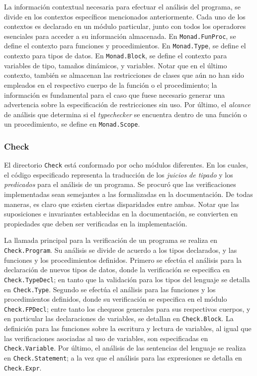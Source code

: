 La información contextual necesaria para efectuar el análisis del programa, se divide en los contextos específicos mencionados anteriormente.
Cada uno de los contextos es declarado en un módulo particular, junto con todos los operadores esenciales para acceder a su información almacenada.
En \lstinline[style = module]{Monad.FunProc}, se define el contexto para funciones y procedimientos.
En \lstinline[style = module]{Monad.Type}, se define el contexto para tipos de datos.
En \lstinline[style = module]{Monad.Block}, se define el contexto para variables de tipo, tamaños dinámicos, y variables.
Notar que en el último contexto, también se almacenan las restricciones de clases que aún no han sido empleados en el respectivo cuerpo de la función o el procedimiento; la información es fundamental para el caso que fuese necesario generar una advertencia sobre la especificación de restricciones sin uso.
Por último, el \textit{alcance} de análisis que determina si el \textit{typechecker} se encuentra dentro de una función o un procedimiento, se define en \lstinline[style = module]{Monad.Scope}.

\subsubsection{Check}

El directorio \lstinline[style = module]{Check} está conformado por ocho módulos diferentes.
En los cuales, el código especificado representa la traducción de los \textit{juicios de tipado} y los \textit{predicados} para el análisis de un programa.
Se procuró que las verificaciones implementadas sean semejantes a las formalizadas en la documentación.
De todas maneras, es claro que existen ciertas disparidades entre ambas.
Notar que las suposiciones e invariantes establecidas en la documentación, se convierten en propiedades que deben ser verificadas en la implementación.

La llamada principal para la verificación de un programa se realiza en \lstinline[style = module]{Check.Program}.
Su análisis se divide de acuerdo a los tipos declarados, y las funciones y los procedimientos definidos.
Primero se efectúa el análisis para la declaración de nuevos tipos de datos, donde la verificación se especifica en \lstinline[style = module]{Check.TypeDecl}; en tanto que la validación para los tipos del lenguaje se detalla en \lstinline[style = module]{Check.Type}.
Segundo se efectúa el análisis para las funciones y los procedimientos definidos, donde su verificación se especifica en el módulo \lstinline[style = module]{Check.FPDecl}; entre tanto los chequeos generales para sus respectivos cuerpos, y en particular las declaraciones de variables, se detallan en \lstinline[style = module]{Check.Block}.
La definición para las funciones sobre la escritura y lectura de variables, al igual que las verificaciones asociadas al uso de variables, son especificadas en \lstinline[style = module]{Check.Variable}.
Por último, el análisis de las sentencias del lenguaje se realiza en \lstinline[style = module]{Check.Statement}; a la vez que el análisis para las expresiones se detalla en \lstinline[style = module]{Check.Expr}.


